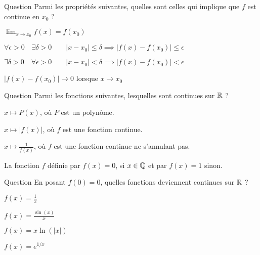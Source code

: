 \begin{multi}[multiple,feedback=
{\(f\) est continue en \(x_0\) si \(\lim_{x\to x_0} f(x) = f(x_0)\), ce qui s'écrit aussi \(\big| f(x) - f(x_0) \big| \to 0\), ou encore :
\(\forall \epsilon >0 \quad \exists \delta > 0 \qquad
|x-x_0| < \delta \implies |f(x)-f(x_0)| < \epsilon\) (et on peut remplacer les inégalités strictes par des inégalités larges).
}]{Question}
Parmi les propriétés suivantes, quelles sont celles qui implique que \(f\) est continue en \(x_ 0\) ?

    \item* \(\lim_{x\to x_0} f(x) = f(x_0)\)
    \item* \(\forall \epsilon >0 \quad \exists \delta > 0 \qquad
|x-x_0| \le \delta \implies |f(x)-f(x_0)| \le \epsilon\)
    \item \(\exists \delta > 0 \quad \forall \epsilon >0 \qquad
|x-x_0| < \delta \implies |f(x)-f(x_0)| < \epsilon\)
    \item* \(\big| f(x) - f(x_0) \big| \to 0\) lorsque \(x \to x_0\)
\end{multi}


\begin{multi}[multiple,feedback=
{La fonction \(f\) définie par \(f(x) = 0\), si \(x\in \Qq\) et par \(f(x)=1\) sinon, est une fonction qui n'est continue en aucun point \(x_0\in \Rr\) !
}]{Question}
Parmi les fonctions suivantes, lesquelles sont continues sur \(\mathbb{R}\) ?

    \item* \(x \mapsto P(x)\), où \(P\) est un polynôme.
    \item* \(x \mapsto |f(x)|\), où \(f\) est une fonction continue.
    \item* \(x \mapsto \frac{1}{f(x)}\), où \(f\) est une fonction continue ne s'annulant pas.
    \item La fonction \(f\) définie par \(f(x) = 0\), si \(x\in \Qq\) et par \(f(x)=1\) sinon.
\end{multi}


\begin{multi}[multiple,feedback=
{Toutes les fonctions sont  continues sur \(\Rr^*\), il s'agit donc de déterminer si \(f(x) \to 0\) lorsque \(x\to0\). C'est uniquement le cas de \(x \ln( |x|)\).
}]{Question}
En posant \(f(0)=0\), quelles fonctions deviennent continues sur \(\mathbb{R}\) ?

    \item \(f(x) = \frac 1x\)
    \item \(f(x) = \frac{\sin(x)}{x}\)
    \item* \(f(x) = x \ln( |x|)\)
    \item \(f(x) = e^{1/x}\)
\end{multi}


